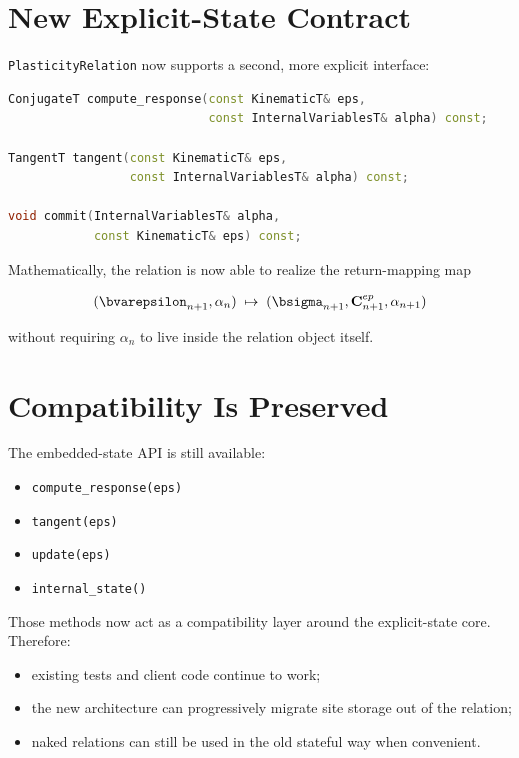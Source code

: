 \section{New Explicit-State Contract}

\texttt{PlasticityRelation} now supports a second, more explicit interface:

\begin{lstlisting}[language=C++]
ConjugateT compute_response(const KinematicT& eps,
                            const InternalVariablesT& alpha) const;

TangentT tangent(const KinematicT& eps,
                 const InternalVariablesT& alpha) const;

void commit(InternalVariablesT& alpha,
            const KinematicT& eps) const;
\end{lstlisting}

Mathematically, the relation is now able to realize the return-mapping map

\begin{align}
(\bvarepsilon_{n+1}, \alpha_n)
\;\mapsto\;
(\bsigma_{n+1}, \mathbf{C}_{n+1}^{ep}, \alpha_{n+1})
\end{align}

without requiring \(\alpha_n\) to live inside the relation object itself.

\section{Compatibility Is Preserved}

The embedded-state API is still available:

\begin{itemize}
  \item \texttt{compute\_response(eps)}
  \item \texttt{tangent(eps)}
  \item \texttt{update(eps)}
  \item \texttt{internal\_state()}
\end{itemize}

Those methods now act as a compatibility layer around the explicit-state core.
Therefore:

\begin{itemize}
  \item existing tests and client code continue to work;
  \item the new architecture can progressively migrate site storage out of the
        relation;
  \item naked relations can still be used in the old stateful way when
        convenient.
\end{itemize}


